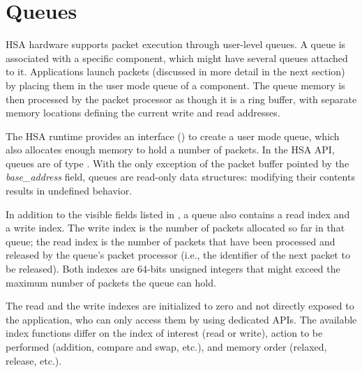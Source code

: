 \documentclass[final]{book}
\newcommand{\reffld}[1]{\textit{#1}}
\begin{document}
\section{Queues} \label{sec:queues}

HSA hardware supports packet execution through user-level queues. A queue is
associated with a specific component, which might have several queues attached
to it. Applications launch packets (discussed in more detail in the next
section) by placing them in the user mode queue of a component. The queue memory
is then processed by the packet processor as though it is a ring buffer, with
separate memory locations defining the current write and read addresses.

The HSA runtime provides an interface () to create a
user mode queue, which also allocates enough memory to hold a number of
packets. In the HSA API, queues are of type . With the only
exception of the packet buffer pointed by the \reffld{base_address} field,
queues are read-only data structures: modifying their contents results in
undefined behavior.

In addition to the visible fields listed in , a queue also
contains a read index and a write index. The write index is the number of
packets allocated so far in that queue; the read index is the number of packets
that have been processed and released by the queue's packet processor (i.e., the
identifier of the next packet to be released). Both indexes are 64-bits unsigned
integers that might exceed the maximum number of packets the queue can hold.

The read and the write indexes are initialized to zero and not directly exposed
to the application, who can only access them by using dedicated APIs.  The
available index functions differ on the index of interest (read or write),
action to be performed (addition, compare and swap, etc.), and memory order
(relaxed, release, etc.).
\end{document}
